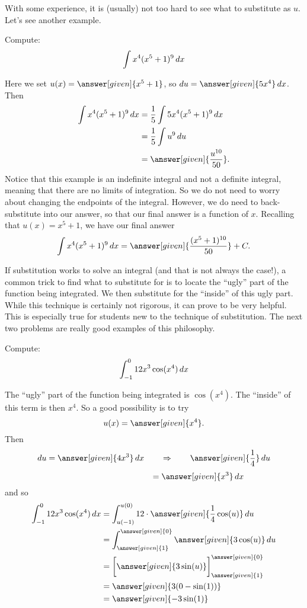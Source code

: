 \documentclass{ximera}
\begin{document}
With some experience, it is (usually) not too hard to see what to
substitute as $u$. Let's see another
example.

\begin{example}
Compute:
\[
\int x^4(x^5+1)^{9} \mathop{}\!d x
\]
\begin{explanation}
Here we set $u(x) =  \answer[given]{x^5+1}$, so $\d u =  \answer[given]{5x^4} \d x$.  Then
\begin{align*}
  \int x^4(x^5+1)^{9} \d x &= \frac{1}{5} \int 5x^4 (x^5+1)^{9} \d x \\
  &= \frac{1}{5} \int u^{9} \d u\\
&= \answer[given]{\frac{u^{10}}{50}}.
\end{align*}
Notice that this example is an indefinite integral and not a definite
integral, meaning that there are no limits of integration.  So we do
not need to worry about changing the endpoints of the integral.  However,
we do need to back-substitute into our answer, so that our final
answer is a function of $x$.  Recalling that $u(x) = x^5+1$, we have
our final answer
\[
\int x^4(x^5+1)^{9} \d x= \answer[given]{\frac{(x^5+1)^{10}}{50}}+C.
\]
\end{explanation}
\end{example}


If substitution works to solve an integral (and that is not always the
case!), a common trick to find what to substitute for is to locate the
``ugly'' part of the function being integrated.  We then substitute
for the ``inside'' of this ugly part.  While this technique is
certainly not rigorous, it can prove to be very helpful.  This is
especially true for students new to the technique of substitution.
The next two problems are really good examples of this philosophy.

\begin{example}
Compute:
\[
\int_{-1}^0 12x^3 \cos(x^4) \mathop{}\!d x
\]
\begin{explanation}
The ``ugly'' part of the function being integrated is $\cos(x^4)$.  The
``inside'' of this term is then $x^4$.  So a good possibility is to
try
\[
u(x) =  \answer[given]{x^4}.
\]
Then
\[
\d u =  \answer[given]{4x^3} \d x 	\qquad	\Rightarrow	\qquad	\answer[given]{\frac{1}{4}} \d u
\]
\[
\phantom{\d u =  4x^3 \d x 	\qquad	\Rightarrow	\qquad} = \answer[given]{x^3}\d x
\]
and so
\begin{align*}
\int_{-1}^0 12x^3 \cos(x^4) \d x &= \int_{u(-1)}^{u(0)} 12 \cdot\answer[given]{\frac{1}{4}\cos(u)} \d u  \\
&= \int_{\answer[given]{1}}^{\answer[given]{0}} \answer[given]{3 \cos(u)} \d u  \\
&= \eval{\answer[given]{3\sin(u)}}_{\answer[given]{1}}^{\answer[given]{0}}  \\
&= \answer[given]{3(0-\sin(1))}\\
&= \answer[given]{-3\sin(1)}
\end{align*}
\end{explanation}
\end{example}
\end{document}
